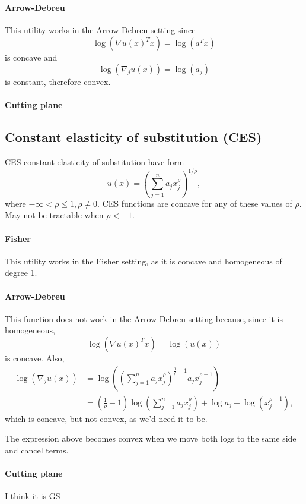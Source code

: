 \documentclass{article}
\begin{document}
\paragraph{Arrow-Debreu}
This utility works in the Arrow-Debreu setting since
\[
\log(\nabla u(x)^T x) = \log(a^T x)
\]
is concave and
\[
\log(\nabla_j u(x)) = \log(a_j)
\]
is constant, therefore convex.

\paragraph{Cutting plane}

\subsection{Constant elasticity of substitution (CES)}
CES constant elasticity of substitution have form
\[
u(x) = \left(\sum_{j=1}^n a_j x_j^\rho \right)^{1/\rho},
\]
where $-\infty < \rho \leq 1, \rho \neq 0$.
CES functions are concave for any of these values of $\rho$.
May not be tractable when $\rho < -1$.

\paragraph{Fisher}
This utility works in the Fisher setting, as it is concave and homogeneous of degree 1.

\paragraph{Arrow-Debreu}
This function does not work in the Arrow-Debreu setting because, since it is homogeneous,
\[
\log(\nabla u(x)^T x) = \log(u(x))
\]
is concave.
Also,
\begin{align*}
\log(\nabla_j u(x)) & = 
\log\left( \left(\sum_{j=1}^n a_j x_j^\rho \right)^{\frac{1}{\rho}-1} a_j x_j^{\rho-1}\right)\\
& = \left(\frac{1}{\rho}-1\right)\log\left( \sum_{j=1}^n a_j x_j^\rho \right) + \log a_j +  \log \left(x_j^{\rho-1}\right),
\end{align*}
which is concave, but not convex, as we'd need it to be.

The expression above becomes convex when we move both logs to the same side and cancel terms. 

\paragraph{Cutting plane} I think it is GS
\end{document}
